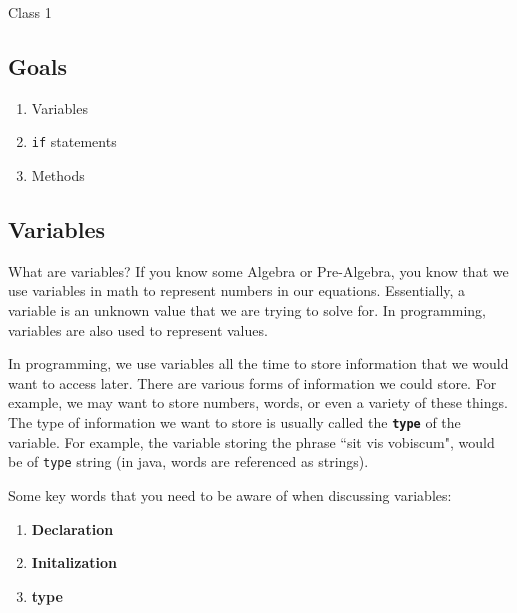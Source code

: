 \documentclass[11pt,fleqn]{article}
\begin{document}
\begin{center}
{\Huge
Class 1
}\\
\end{center}

\begin{center}
\section*{Goals}
\end{center}

\begin{enumerate}[1.]
\item
Variables

\item
\texttt{if} statements

\item 
Methods

\end{enumerate}

\begin{center}
\section*{Variables}
\end{center}

What are variables? If you know some Algebra or Pre-Algebra, you know that
we use variables in math to represent numbers in our equations. Essentially, a
variable is an unknown value that we are trying to solve for. In programming,
variables are also used to represent values. 

In programming, we use variables all the time to store information that we would
want to access later. There are various forms of information we could store. For
example, we may want to store numbers, words, or even a variety of these things.
The type of information we want to store is usually called the
\textbf{\texttt{type}} of the variable. For example, the variable storing the
phrase ``sit vis vobiscum", would be of \texttt{type} string (in java, words are
referenced as strings). 

Some key words that you need to be aware of when discussing variables:
\begin{enumerate}
\item
\textbf{Declaration}

\item
\textbf{Initalization}

\item
\textbf{type}
\end{enumerate}
\end{document}
